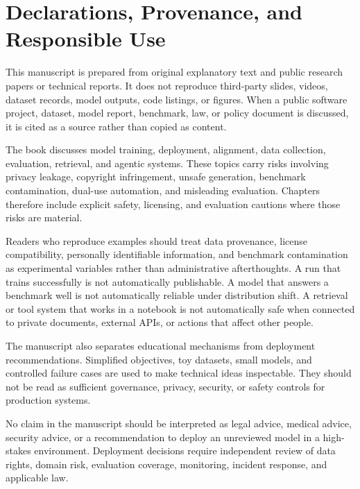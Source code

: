 \chapter*{Declarations, Provenance, and Responsible Use}
%

This manuscript is prepared from original explanatory text and public research papers or technical reports. It does not reproduce third-party slides, videos, dataset records, model outputs, code listings, or figures. When a public software project, dataset, model report, benchmark, law, or policy document is discussed, it is cited as a source rather than copied as content.

The book discusses model training, deployment, alignment, data collection, evaluation, retrieval, and agentic systems. These topics carry risks involving privacy leakage, copyright infringement, unsafe generation, benchmark contamination, dual-use automation, and misleading evaluation. Chapters therefore include explicit safety, licensing, and evaluation cautions where those risks are material.

Readers who reproduce examples should treat data provenance, license compatibility, personally identifiable information, and benchmark contamination as experimental variables rather than administrative afterthoughts. A run that trains successfully is not automatically publishable. A model that answers a benchmark well is not automatically reliable under distribution shift. A retrieval or tool system that works in a notebook is not automatically safe when connected to private documents, external APIs, or actions that affect other people.

The manuscript also separates educational mechanisms from deployment recommendations. Simplified objectives, toy datasets, small models, and controlled failure cases are used to make technical ideas inspectable. They should not be read as sufficient governance, privacy, security, or safety controls for production systems.

No claim in the manuscript should be interpreted as legal advice, medical advice, security advice, or a recommendation to deploy an unreviewed model in a high-stakes environment. Deployment decisions require independent review of data rights, domain risk, evaluation coverage, monitoring, incident response, and applicable law.
